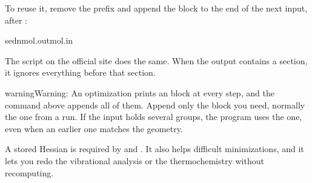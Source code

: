 \documentclass[letterpaper,10pt,english,openany,oneside]{sphinxmanual}
\begin{document}
\sphinxAtStartPar
To reuse it, remove the prefix and append the block to the end of the next input, after :

\begin{sphinxVerbatim}[commandchars=\\\{\}]
sed\PYGZhy{}nmol.out\PYGZgt{}\PYGZgt{}mol.in
\end{sphinxVerbatim}

\sphinxAtStartPar
The  script on the official site does the same. When the output contains a 
section, it ignores everything before that section.



\begin{sphinxadmonition}{warning}{Warning:}
\sphinxAtStartPar
An optimization prints an  block at every step, and the command above appends all of them. Append only the
block you need, normally the one from a  run. If the input holds several  groups, the
program uses the  one, even when an earlier one matches the geometry.
\end{sphinxadmonition}



\sphinxAtStartPar
A stored Hessian is required by {\hyperref[\detokenize{reference/optimize:optimize-saddle}]{}} and . It also helps difficult
minimizations, and it lets you redo the vibrational analysis or the thermochemistry without recomputing.
\end{document}
